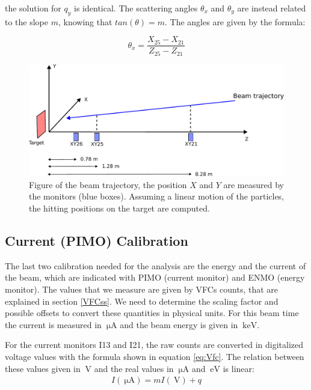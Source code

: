the solution for $q_{y}$ is identical. The scattering angles $\theta_{x}$ and $\theta_{y}$ are instead related to the slope $m$, knowing that $tan(\theta) = m$. The angles are given by the formula:

\begin{equation}
\theta_{x} = \dfrac{X_{25} - X_{21}}{Z_{25} - Z_{21}}
\end{equation}
\begin{figure}[hbtp]
\centering
\includegraphics[scale=0.75]{Appendix/scheme.pdf}
\caption{Figure of the beam trajectory, the position $X$ and $Y$ are measured by the monitors (blue boxes). Assuming a linear motion of the particles, the hitting positions on the target are computed.}
\label{fig:BeamTraje}
\end{figure}

\subsection{Current (PIMO) Calibration} \label{CurrentCalibration}

The last two calibration needed for the analysis are the energy and the current of the beam, which are indicated with PIMO (current monitor) and ENMO (energy monitor). The values that we measure are given by VFCs counts, that are explained in section \ref{VFCss}. We need to determine the scaling factor and possible offsets to convert these quantities in physical units. For this beam time the current is measured in $\SI{}{\micro \ampere}$ and the beam energy is given in $\SI{}{\kilo \electronvolt}$.

For the current monitors I13 and I21, the raw counts are converted in digitalized voltage values with the formula shown in equation \ref{eq:Vfc}. The relation between these values given in $\SI{}{\volt}$ and the real values in $\SI{}{\micro \ampere}$ and $\SI{}{\electronvolt}$ is linear:
\begin{align*}
I(\SI{}{\micro \ampere}) = m I(\SI{}{\volt}) + q
\end{align*}

